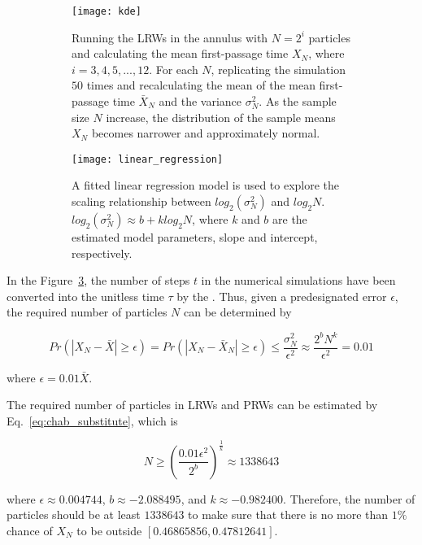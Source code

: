 \begin{figure}
  \begin{subfigure}{0.9\textwidth}
    \centering
    \texttt{[image: kde]}
    \caption{Running the LRWs in the annulus with $N = 2^i$
      particles and calculating the mean first-passage time $X_N$, where
      $i=3, 4, 5, ..., 12$. For each $N$, replicating the simulation
      $50$ times and recalculating the mean of the mean first-passage
      time $\bar X_{N}$ and the variance $\sigma^2_{N}$. As the sample
      size $N$ increase, the distribution of the sample means $X_N$
      becomes narrower and approximately normal. \label{fig:annulus_kde}}
  \end{subfigure}
  \begin{subfigure}{0.9\textwidth}
    \centering
    \texttt{[image: linear\_regression]}
    \caption{A fitted linear regression model is used to explore the
      scaling relationship between $log_{2} (\sigma^2_{N})$ and
      $log_{2} N$. $log_{2} (\sigma^2_{N}) \approx b + k log_{2} N$,
      where $k$ and $b$ are the estimated model parameters, slope and
      intercept, respectively.\label{fig:annulus_linear_regression}}
  \end{subfigure}
  \caption{\label{fig:annulus_cheb}}
\end{figure}


In the Figure~\ref{fig:annulus_cheb}, the number of steps $t$ in the
numerical simulations have been converted into the unitless time
$\tau$ by the . Thus, given a predesignated error
$\epsilon$, the required number of particles $N$ can be determined by

\begin{equation}\label{eq:chab_substitute}
  Pr(|X_{N} - \bar X| \geq \epsilon) = Pr(|X_{N} - \bar X_{N}| \geq
  \epsilon) \leq \frac{\sigma^2_{N}}{\epsilon^2} \approx \frac{2^b
    N^k}{\epsilon^2} = 0.01
\end{equation}

where $\epsilon = 0.01 \bar X$.

The required number of particles in LRWs and PRWs can be estimated by
Eq.~\ref{eq:chab_substitute}, which is

\begin{equation}\label{eq:cheb_sample_size}
  N \geq (\frac{0.01 \epsilon^2}{2^b})^{\frac{1}{k}} \approx 1338643
\end{equation}

where $\epsilon \approx 0.004744$, $b \approx -2.088495$, and $k
\approx -0.982400$. Therefore, the number of particles should be at
least $1338643$ to make sure that there is no more than $1\%$ chance
of $X_N$ to be outside $[0.46865856, 0.47812641]$.


